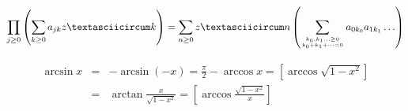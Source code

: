 \documentclass{article}
\begin{document}
    \[
        \prod_{j\ge0}\left( \sum_{k\ge0} a_{jk}zˆk \right) = \sum_{n\ge0} zˆn \left(\sum_{k_0,k_1\ldots\ge0 \atop k_0+k_1+\cdots=0} a_{0k_0} a_{1k_1}\ldots \right)
    \]

    \begin{eqnarray}
        \arcsin{x} & = & -\arcsin(-x)=\frac{\pi}{2} - \arccos x=\left [\arccos\sqrt{1-x^2}\right] \nonumber \\
                   & = & \arctan\frac{x}{\sqrt{1-x^2}} = \left [\arccos \frac{\sqrt{1-x^2}}{x}\right]
    \end{eqnarray}
\end{document}
